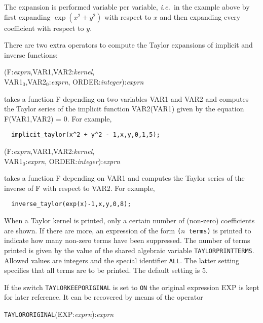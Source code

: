 The expansion is performed variable per variable, {\em i.e.\ }in the
example above by first expanding $\exp(x^{2}+y^{2})$ with respect 
to $x$ and then expanding every coefficient with respect to $y$.

 There are two
extra operators to compute the Taylor expansions of implicit and
inverse functions:

(F:{\em exprn},VAR1,VAR2:{\em kernel},\\
VAR1$_0$,VAR2$_0$:{\em exprn},
                                 ORDER:{\em integer}):{\em exprn}

takes a function F depending on two variables VAR1 and VAR2 and
computes the Taylor series of the implicit function VAR2(VAR1)
given by the equation F(VAR1,VAR2) = 0.  For example,

\begin{verbatim}
  implicit_taylor(x^2 + y^2 - 1,x,y,0,1,5);
\end{verbatim}

(F:{\em exprn},VAR1,VAR2:{\em kernel},\\
VAR1$_0$:{\em exprn},
                                 ORDER:{\em integer}):{\em exprn}

takes a function F depending on VAR1 and computes the Taylor series of
the inverse of F with respect to VAR2.  For example,

\begin{verbatim}
  inverse_taylor(exp(x)-1,x,y,0,8);
\end{verbatim}


When a Taylor kernel is printed, only a certain number of (non-zero)
coefficients are shown.  If there are more, an expression of the form
\verb|(|$n$\verb| terms)| is printed to indicate how many non-zero
terms have been suppressed.  The number of terms printed is given by
the value of the shared algebraic variable \verb|TAYLORPRINTTERMS|.
Allowed values are integers and the special identifier \verb|ALL|.  The
latter setting specifies that all terms are to be printed.  The default
setting is $5$.


If the switch \verb|TAYLORKEEPORIGINAL| is set to \verb|ON| the
original expression EXP is kept for later reference.
It can be recovered by means of the operator

\hspace*{2em} {\tt TAYLORORIGINAL}(EXP:{\em exprn}):{\em exprn}

